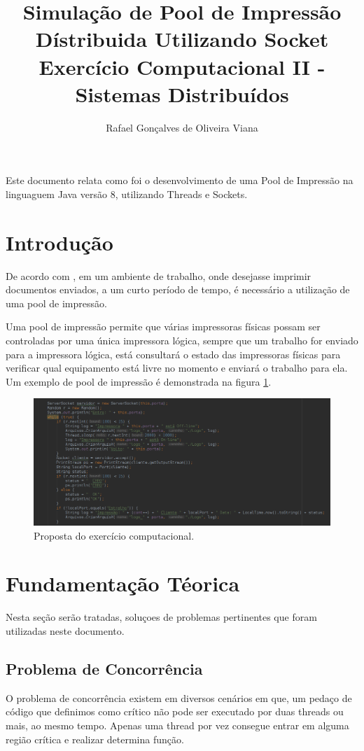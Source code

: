 \documentclass[12pt]{article}
\title{ Simulação de Pool de Impressão Dístribuida Utilizando Socket \\ Exercício Computacional II - Sistemas Distribuídos}
\author{Rafael Gonçalves de Oliveira Viana\inst{1}  }
\begin{document}
 

\maketitle

     
\begin{resumo} 	
  Este  documento relata como foi o desenvolvimento de uma Pool de Impressão na linguaguem Java versão 8, utilizando Threads e Sockets.
\end{resumo}

\section{Introdução}
De acordo com \cite{entf}, em um ambiente de trabalho, onde desejasse imprimir documentos enviados, a um curto período de tempo, é necessário a utilização de uma pool de impressão.

Uma pool de impressão permite que várias impressoras físicas possam ser controladas por uma única impressora lógica,  sempre que um trabalho for enviado para a impressora lógica, está consultará o estado das impressoras físicas para verificar qual equipamento está livre no momento e enviará o trabalho para ela.
 Um exemplo de pool de impressão é demonstrada na figura \ref{fig:screenshot001}.

\begin{figure}[H]
 	\centering
 	\includegraphics[width=0.7\linewidth]{imagens/screenshot001}
 	\caption{Proposta do exercício computacional.}
 	\label{fig:screenshot001}
 \end{figure}
 
\section{Fundamentação Téorica} 
	Nesta seção serão tratadas, soluçoes de problemas pertinentes que foram utilizadas neste documento.


\subsection{Problema de Concorrência}
O problema de concorrência existem em diversos cenários em que, um pedaço de código que definimos como crítico não pode ser executado por duas threads ou mais, ao mesmo tempo. Apenas uma thread por vez consegue entrar em alguma região crítica e realizar determina função.
\end{document}
